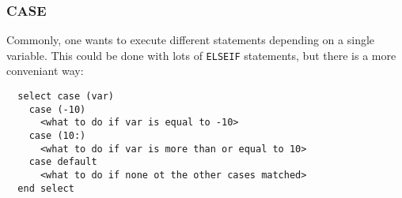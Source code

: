 \begin{frame}[fragile]
  \frametitle{CASE}

  Commonly, one wants to execute different statements depending on a single 
  variable.
  This could be done with lots of \texttt{ELSEIF} statements, but there is
  a more conveniant way:
  
  \begin{lstlisting}
  select case (var)
    case (-10)
      <what to do if var is equal to -10>
    case (10:)
      <what to do if var is more than or equal to 10>
    case default
      <what to do if none ot the other cases matched>
  end select
  \end{lstlisting}

\end{frame}

